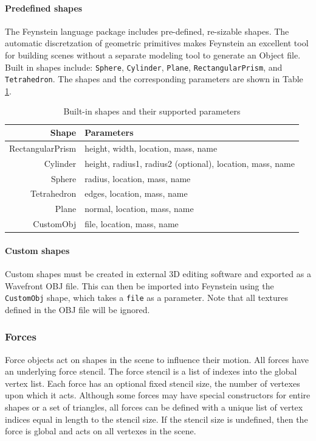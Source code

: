 \paragraph{Predefined shapes}
The Feynstein language package includes pre-defined, re-sizable
shapes. The automatic discretzation of geometric primitives makes
Feynstein an excellent tool for building scenes without a separate
modeling tool to generate an Object file.  Built in shapes include:
\texttt{Sphere}, \texttt{Cylinder}, \texttt{Plane},
\texttt{RectangularPrism}, and \texttt{Tetrahedron}. The shapes and
the corresponding parameters are shown in Table \ref{tab:shapes}.

\begin{table}\centering
  \begin{tabular}{r|l}
    Shape & Parameters \\ \hline
    RectangularPrism & height, width, location, mass, name \\
    Cylinder & height, radius1, radius2 (optional), location, mass, name \\
    Sphere & radius, location, mass, name \\
    Tetrahedron & edges, location, mass, name \\
    Plane & normal, location, mass, name \\
    CustomObj & file, location, mass, name \\
  \end{tabular} 
\caption{Built-in shapes and their supported parameters}
\label{tab:shapes}
\end{table}

\paragraph{Custom shapes}
Custom shapes must be created in external 3D editing software and
exported as a Wavefront OBJ file. This can then be imported into
Feynstein using the \texttt{CustomObj} shape, which takes a \texttt{file} as a
parameter. Note that all textures defined in the OBJ file will be
ignored.

\subsubsection{Forces}
Force objects act on shapes in the scene to influence their
motion. All forces have an underlying force stencil. The force stencil
is a list of indexes into the global vertex list. Each force has an
optional fixed stencil size, the number of vertexes upon which it
acts. Although some forces may have special constructors for entire
shapes or a set of triangles, all forces can be defined with a unique
list of vertex indices equal in length to the stencil size. If the
stencil size is undefined, then the force is global and acts on all
vertexes in the scene.

